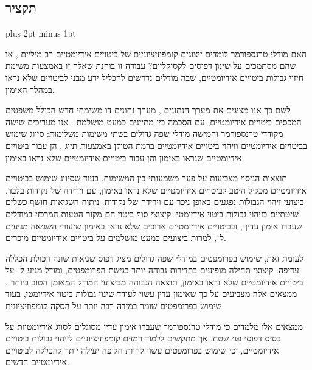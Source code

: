 \documentclass[11pt, a4paper]{report}
\begin{document}
\clearpage
\begin{otherlanguage}{hebrew}

\chapter*{תקציר}

{\parindent=0pt \parskip=6pt plus 2pt minus 1pt \justifying
\noindent

האם מודלי טרנספורמר  לומדים ייצוגים קומפוזיציוניים של ביטויים אידיומטיים רב מיליים , או שהם מסתמכים על שינון דפוסים לקסיקליים? עבודה זו בוחנת שאלה זו באמצעות משימת חיזוי גבולות ביטויים אידיומטיים, שבה מודלים נדרשים להכליל ידע מבני לביטויים שלא נראו במהלך האימון.

לשם כך אנו מציגים את מערך הנתונים , מערך נתונים דו משימתי חדש הכולל  משפטים המכסים  ביטויים אידיומטיים, עם הסכמה בין מתייגים כמעט מושלמת . אנו מעריכים שישה מקודדי טרנספורמר  וחמישה מודלי שפה גדולים  בשתי משימות משלימות: סיווג שימוש בביטויים אידיומטיים  וזיהוי ביטויים אידיומטיים ברמת הטוקן  באמצעות תיוג , הן עבור ביטויים אידיומטיים שנראו באימון והן עבור ביטויים אידיומטיים שלא נראו באימון.

תוצאות הניסוי מצביעות על פער משמעותי בין המשימות. בעוד שסיווג שימוש בביטויים אידיומטיים מכליל היטב לביטויים אידיומטיים שלא נראו באימון, עם  וירידה של  נקודות בלבד, ביצועי זיהוי הגבולות נפגעים באופן ניכר עם  וירידה של  נקודות. ניתוח השגיאות חושף כשלים שיטתיים בזיהוי גבולות ביטוי אידיומטי: קיצוצי סוף ביטוי  הם מקור הטעות המרכזי במודלים שעברו אימון עדין , ובביטויים אידיומטיים ארוכים שלא נראו באימון  שיעורי השגיאה מגיעים ל־, למרות ביצועים כמעט מושלמים על ביטויים אידיומטיים מוכרים.

לעומת זאת, שימוש בפרומפטים  במודלי שפה גדולים מציג דפוס שגיאות שונה ויכולת הכללה עדיפה. קיצוצי תחילה  מופיעים בתדירות גבוהה יותר בגישת הפרומפטים, ומודל  מגיע ל־ על ביטויים אידיומטיים שלא נראו באימון, תוצאה הגבוהה מביצועי המודל המאומן הטוב ביותר . ממצאים אלה מצביעים על כך שאימון עדין עשוי לעודד שינון גבולות ביטוי אידיומטי, בעוד שימוש בפרומפטים שומר במידה רבה יותר על הסקה קומפוזיציונית.

ממצאים אלו מלמדים כי מודלי טרנספורמר שעברו אימון עדין מסוגלים לסווג אידיומטיות על בסיס דפוסי פני שטח, אך מתקשים ללמוד רמזים קומפוזיציוניים לזיהוי גבולות ביטויים אידיומטיים, וכי שימוש בפרומפטים עשוי להוות חלופה יעילה יותר להכללה לביטויים אידיומטיים חדשים.


\vspace{1cm}
}
\end{otherlanguage}
\clearpage
\end{document}
